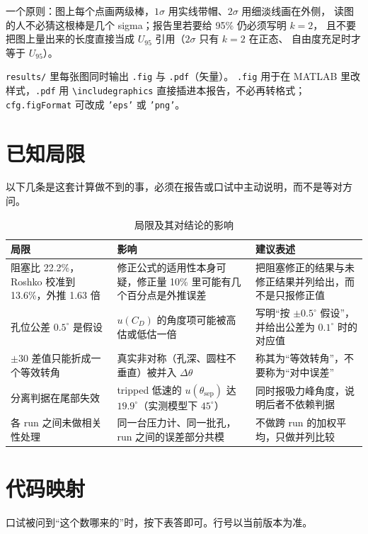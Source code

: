 \documentclass[11pt,a4paper]{ctexart}
\newcommand{\CD}{\ensuremath{C_D}}
\begin{document}
一个原则：图上每个点画两级棒，$1\sigma$ 用实线带帽、$2\sigma$ 用细淡线画在外侧，
读图的人不必猜这根棒是几个 sigma；报告里若要给 95\% 仍必须写明 $k=2$，
且不要把图上量出来的长度直接当成 $U_{95}$ 引用（$2\sigma$ 只有 $k=2$ 在正态、
自由度充足时才等于 $U_{95}$）。

\texttt{results/} 里每张图同时输出 \texttt{.fig} 与 \texttt{.pdf}（矢量）。
\texttt{.fig} 用于在 MATLAB 里改样式，\texttt{.pdf} 用 \texttt{\textbackslash includegraphics}
直接插进本报告，不必再转格式；\texttt{cfg.figFormat} 可改成 \texttt{'eps'} 或 \texttt{'png'}。

\section{已知局限}

以下几条是这套计算做不到的事，必须在报告或口试中主动说明，而不是等对方问。

\begin{table}[H]
\centering
\caption{局限及其对结论的影响}
\small
\begin{tabularx}{\textwidth}{@{}p{4.2cm} X X@{}}
\toprule
局限 & 影响 & 建议表述 \\
\midrule
阻塞比 22.2\%，Roshko 校准到 13.6\%，外推 1.63 倍 &
修正公式的适用性本身可疑，修正量 10\% 里可能有几个百分点是外推误差 &
把阻塞修正的结果与未修正结果并列给出，而不是只报修正值 \\
孔位公差 $0.5^\circ$ 是假设 &
$u(\CD)$ 的角度项可能被高估或低估一倍 &
写明“按 $\pm0.5^\circ$ 假设”，并给出公差为 $0.1^\circ$ 时的对应值 \\
$\pm30$ 差值只能折成一个等效转角 &
真实非对称（孔深、圆柱不垂直）被并入 $\Delta\theta$ &
称其为“等效转角”，不要称为“对中误差” \\
分离判据在尾部失效 &
tripped 低速的 $u(\theta_{\text{sep}})$ 达 $19.9^\circ$（实测模型下 $45^\circ$） &
同时报吸力峰角度，说明后者不依赖判据 \\
各 run 之间未做相关性处理 &
同一台压力计、同一批孔，run 之间的误差部分共模 &
不做跨 run 的加权平均，只做并列比较 \\
\bottomrule
\end{tabularx}
\end{table}

\section{代码映射}

口试被问到“这个数哪来的”时，按下表答即可。行号以当前版本为准。
\end{document}
